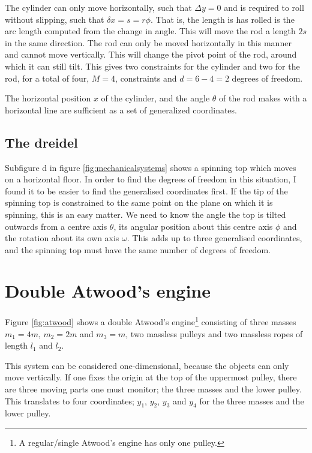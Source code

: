 \documentclass[11pt]{amsart}
\begin{document}
The cylinder can only move horizontally, such that $\Delta y=0$ and is required to roll without slipping, such that $\delta x = s = r\phi$. That is, the length is has rolled is the arc length computed from the change in angle. This will move the rod a length $2s$ in the same direction. The rod can only be moved horizontally in this manner and cannot move vertically. This will change the pivot point of the rod, around which it can still tilt. This gives two constraints for the cylinder and two for the rod, for a total of four, $M=4$, constraints and $d = 6-4=2$ degrees of freedom.

The horizontal position $x$ of the cylinder, and the angle $\theta$ of the rod makes with a horizontal line are sufficient as a set of generalized coordinates.

\subsection{The dreidel}
Subfigure d in figure \ref{fig:mechanicalsystems} shows a spinning top which moves on a horizontal floor. In order to find the degrees of freedom in this situation, I found it to be easier to find the generalised coordinates first. If the tip of the spinning top is constrained to the same point on the plane on which it is spinning, this is an easy matter. We need to know the angle the top is tilted outwards from a centre axis $\theta$, its angular position about this centre axis $\phi$ and the rotation about its own axis $\omega$. This adds up to three generalised coordinates, and the spinning top must have the same number of degrees of freedom.

\section{Double Atwood's engine}

Figure \ref{fig:atwood} shows a double Atwood's engine\footnote{A regular/single Atwood's engine has only one pulley.} consisting of three masses $m_1 = 4m$, $m_2=2m$ and $m_3=m$, two massless pulleys and two massless ropes of length $l_1$ and $l_2$.

This system can be considered one-dimensional, because the objects can only move vertically. If one fixes the origin at the top of the uppermost pulley, there are three moving parts one must monitor; the three masses and the lower pulley. This translates to four coordinates; $y_1$, $y_2$, $y_3$ and $y_4$ for the three masses and the lower pulley.
\end{document}
